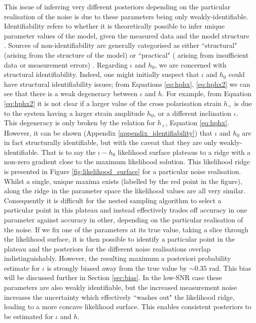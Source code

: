 \documentclass[fleqn,usenatbib,useAMS]{mnras}
\begin{document}
This issue of inferring very different posteriors depending on the particular realisation of the noise is due to these parameters being only weakly-identifiable. Identifiability refers to whether it is theoretically possible to infer unique parameter values of the model, given the measured data and the model structure \citep{e5be7c83a0d24500826f6e1b414d1733}. Sources of non-identifiability are generally categorised as either ``structural" (arising from the structure of the model) or ``practical" ( arising from insufficient data or measurement errors) \citep{GUILLAUME2019418}. Regarding $\iota$ and $h_0$, we are concerned with structural identifiability. Indeed, one might initially suspect that $\iota$ and $h_0$ could have structural identifiability issues; from Equations \eqref{eq:hphx}, \eqref{eq:hphx2} we can see that there is a weak degeneracy between $\iota$ and $h$. For example, from Equation \eqref{eq:hphx2} it is not clear if a larger value of the cross polarisation strain $h_{\times}$ is due to the system having a larger strain amplitude $h_0$, or a different inclination $\iota$. This degeneracy is only broken by the relation for $h_{+}$, Equation \eqref{eq:hphx}. However, it can be shown (Appendix \ref{appendix_identifiability}) that $\iota$ and $h_0$ are in fact structurally identifiable, but with the caveat that they are only weakly-identifiable. That is to say the $\iota-h_0$ likelihood surface plateaus to a ridge with a non-zero gradient close to the maximum likelihood solution. This likelihood ridge is presented in Figure \ref{fig:likelihood_surface} for a particular noise realisation. Whilst a single, unique maxima exists (labelled by the red point in the figure), along the ridge in the parameter space the likelihood values are all very similar. Consequently it is difficult for the nested sampling algorithm to select a particular point in this plateau and instead effectively trades off accuracy in one parameter against accuracy in other, depending on the particular realisation of the noise. If we fix one of the parameters at its true value, taking a slice through the likelihood surface, it is then possible to identify a particular point in the plateau and the posteriors for the different noise realisations overlap indistinguishably. However, the resulting maximum a posteriori probability estimate for $\iota$ is strongly biased away from the true value by $\sim 0.35$ rad. This bias will be discussed further in Section \ref{sec:bias}. In the low-SNR case these parameters are also weakly identifiable, but the increased measurement noise increases the uncertainty which effectively ``washes out" the likelihood ridge, leading to a more concave likelihood surface. This enables consistent posteriors to be estimated for $\iota$ and $h$. 
\end{document}
